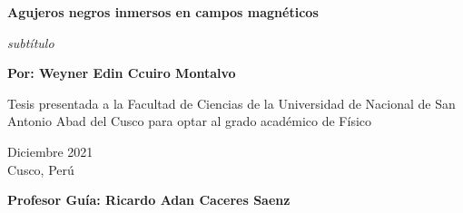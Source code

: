 \documentclass[../Main.tex]{subfiles}
\begin{document}
\begin{titlepage}
	
	
	\thispagestyle{frontpage}
	
	\begin{center}
		
		\vspace*{4\baselineskip}
	
		
		{\Huge \textbf{Agujeros negros inmersos en campos magnéticos\\}}%
		        \vspace*{1.5\baselineskip}

		\large{\textit{subtítulo}}\\ %
		
        \vspace*{1,5\baselineskip}

		\large{\textbf{Por: Weyner Edin Ccuiro Montalvo}}\\ %
		
		\vspace{1,5\baselineskip}
		
		\large{Tesis presentada a la Facultad de Ciencias de la Universidad de Nacional de San Antonio Abad del Cusco para optar al grado académico de Físico} %
		
		\vspace{1,5\baselineskip}
		Diciembre 2021\\ %
		Cusco, Perú %
\vspace{1,5\baselineskip}

		\large{\textbf{Profesor Guía: Ricardo Adan Caceres Saenz}}\\ %

	\end{center}
	
	\vspace*{4\baselineskip}
	
	
\end{titlepage}
\end{document}
